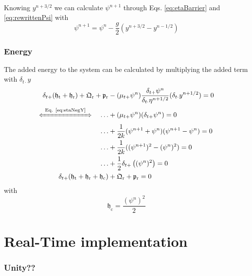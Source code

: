 Knowing $y^{n+3/2}$ we can calculate $\psi^{n+1}$ through Eqs. \eqref{eq:etaBarrier} and \eqref{eq:rewrittenPsi} with
\begin{equation}\label{eq:psiUpdate}
    \psi^{n+1} = \psi^n - \frac{g}{2}\left(y^{n+3/2} - y^{n-1/2}\right)
\end{equation}
\subsubsection{Energy}
The added energy to the system can be calculated by multiplying the added term with $\delta_{t\cdot}y$
\begin{align}
    \delta_{t+}(\mathfrak{h}_\text{t}+\mathfrak{h}_\text{r}) + \mathfrak{Q}_\text{r} + \mathfrak{p}_\text{r}&-(\mu_{t+}\psi^n) \frac{\delta_{t+}\psi^n}{\delta_{t\cdot}\eta^{n+1/2}}(\delta_{t\cdot}y^{n+1/2}) = 0\nonumber\\[-5pt]
    \xLeftrightarrow{\mystrut\ \text{Eq. \eqref{eq:etaNegY}}\ }\quad \hdots &+ (\mu_{t+}\psi^n) (\delta_{t+}\psi^n) = 0\nonumber\\
    \hdots &+ \frac{1}{2k}(\psi^{n+1}+\psi^n)(\psi^{n+1} - \psi^n)=0\nonumber\\
    \hdots  &+\frac{1}{2k}((\psi^{n+1})^2 - (\psi^n)^2)=0\nonumber\\
    \hdots &+ \frac{1}{2}\delta_{t+}\left((\psi^n)^2\right) = 0\nonumber\\
    \delta_{t+}(\mathfrak{h}_\text{t}+\mathfrak{h}_\text{r} + \mathfrak{h}_\text{c}) &+ \mathfrak{Q}_\text{r} + \mathfrak{p}_\text{r} = 0
\end{align}
with
\begin{equation}
    \mathfrak{h}_\text{c} = \frac{(\psi^n)^2}{2 }\nonumber
\end{equation}
\section{Real-Time implementation}
\subsubsection{Unity??}

